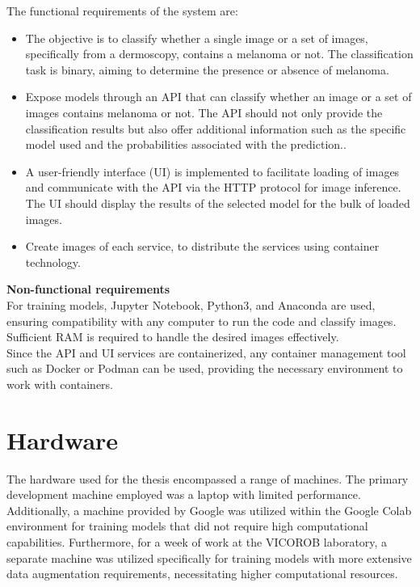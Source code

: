 The functional requirements of the system are:

\begin{itemize}
    \item The objective is to classify whether a single image or a set of images, specifically from a dermoscopy, contains a melanoma or not. The classification task is binary, aiming to determine the presence or absence of melanoma.

    \item Expose models through an API that can classify whether an image or a set of images contains melanoma or not. The API should not only provide the classification results but also offer additional information such as the specific model used and the probabilities associated with the prediction..

    \item A user-friendly interface (UI) is implemented to facilitate loading of images and communicate with the API via the HTTP protocol for image inference. The UI should display the results of the selected model for the bulk of loaded images.

    \item Create images of each service, to distribute the services using container technology.
\end{itemize}

\vspace{0.5cm}
\textbf{Non-functional requirements} \\

For training models, Jupyter Notebook, Python3, and Anaconda are used, ensuring compatibility with any computer to run the code and classify images. Sufficient RAM is required to handle the desired images effectively. \\

Since the API and UI services are containerized, any container management tool such as Docker or Podman can be used, providing the necessary environment to work with containers.

\newpage

\section{Hardware}

The hardware used for the thesis encompassed a range of machines. The primary development machine employed was a laptop with limited performance. Additionally, a machine provided by Google was utilized within the Google Colab environment for training models that did not require high computational capabilities. Furthermore, for a week of work at the VICOROB laboratory, a separate machine was utilized specifically for training models with more extensive data augmentation requirements, necessitating higher computational resources. \\


